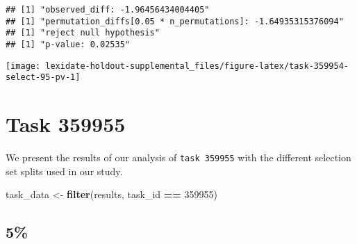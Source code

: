 \documentclass[
]{book}
\newenvironment{Shaded}{\begin{snugshade}}{\end{snugshade}}
\newcommand{\AttributeTok}[1]{\textcolor[rgb]{0.13,0.29,0.53}{#1}}
\newcommand{\DecValTok}[1]{\textcolor[rgb]{0.00,0.00,0.81}{#1}}
\newcommand{\FunctionTok}[1]{\textcolor[rgb]{0.13,0.29,0.53}{\textbf{#1}}}
\newcommand{\NormalTok}[1]{#1}
\newcommand{\OtherTok}[1]{\textcolor[rgb]{0.56,0.35,0.01}{#1}}
\newcommand{\SpecialCharTok}[1]{\textcolor[rgb]{0.81,0.36,0.00}{\textbf{#1}}}
\newcommand{\StringTok}[1]{\textcolor[rgb]{0.31,0.60,0.02}{#1}}
\begin{document}
\begin{Shaded}
\end{Shaded}

\begin{verbatim}
## [1] "observed_diff: -1.96456434004405"
## [1] "permutation_diffs[0.05 * n_permutations]: -1.64935315376094"
## [1] "reject null hypothesis"
## [1] "p-value: 0.02535"
\end{verbatim}

\texttt{[image: lexidate-holdout-supplemental\_files/figure-latex/task-359954-select-95-pv-1]}

\hypertarget{task-359955}{%
\chapter{Task 359955}\label{task-359955}}

We present the results of our analysis of \texttt{task\ 359955} with the different selection set splits used in our study.

\begin{Shaded}
\begin{Highlighting}[]
\NormalTok{task\_data }\OtherTok{\textless{}{-}} \FunctionTok{filter}\NormalTok{(results, task\_id }\SpecialCharTok{==} \DecValTok{359955}\NormalTok{)}
\end{Highlighting}
\end{Shaded}

\hypertarget{section-10}{%
\section{5\%}\label{section-10}}
\end{document}
